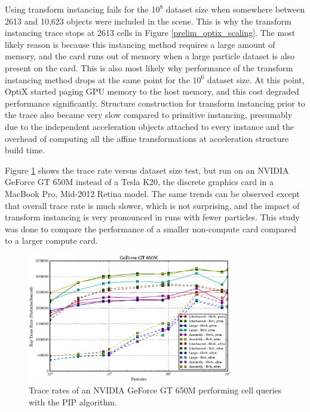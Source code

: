 Using transform instancing fails for the $10^8$ dataset size when somewhere between 2613 and 10,623 objects were included in the scene.  This is why the transform instancing trace stops at 2613 cells in Figure \ref{prelim_optix_scaling}.  The most likely reason is because this instancing method requires a large amount of memory, and the card runs out of memory when a large particle dataset is also present on the card.  This is also most likely why performance of the transform instancing method drops at the same point for the $10^6$ dataset size.  At this point, OptiX started paging GPU memory to the host memory, and this cost degraded performance significantly.  Structure construction for transform instancing prior to the trace also became very slow compared to primitive instancing, presumably due to the independent acceleration objects attached to every instance and the overhead of computing all the affine transformations at acceleration structure build time.


Figure \ref{prelim_optix_G650M} shows the trace rate versus dataset size test, but run on an NVIDIA GeForce GT 650M instead of a Tesla K20, the discrete graphics card in a MacBook Pro, Mid-2012 Retina model.  The same trends can be observed except that overall trace rate is much slower, which is not surprising,%
 and the impact of transform instancing is very pronounced in runs with fewer particles.  This study was done to compare the performance of a smaller non-compute card compared to a larger compute card.

\begin{figure}[h!] 
  \centering
    \includegraphics[width=0.8\textwidth]{graphics/prelim_optix_G650M.eps}
     \caption{Trace rates of an NVIDIA GeForce GT 650M performing cell queries with the PIP algorithm. \label{prelim_optix_G650M} }
\end{figure}%

